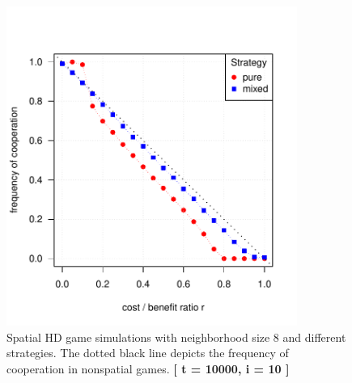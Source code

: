 \begin{figure}[H]
	\centering 
	\includegraphics[width=9.5cm]{task3_multiplot}
	\caption{Spatial HD game simulations with neighborhood size 8 and different strategies. The dotted black line depicts the frequency of cooperation in nonspatial games.  \textbf{[ t = 10000, i = 10 ]} }\label{fig: task3_multiplot}
\end{figure}





